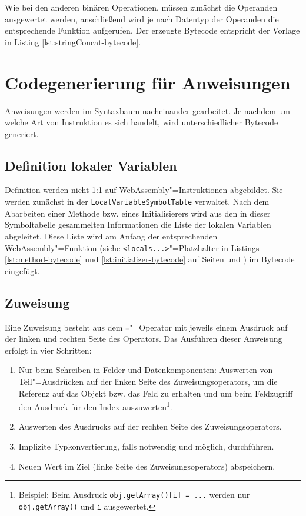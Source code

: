 Wie bei den anderen binären Operationen, müssen zunächst die Operanden ausgewertet werden, anschließend wird je nach Datentyp der Operanden die entsprechende Funktion aufgerufen. Der erzeugte Bytecode entspricht der Vorlage in Listing \ref{lst:stringConcat-bytecode}.



\section{Codegenerierung für Anweisungen}

Anweisungen werden im Syntaxbaum nacheinander gearbeitet. Je nachdem um welche Art von Instruktion es sich handelt, wird unterschiedlicher Bytecode generiert.

\subsection{Definition lokaler Variablen}

Definition werden nicht 1:1 auf WebAssembly"=Instruktionen abgebildet. Sie werden zunächst in der \lstinline{LocalVariableSymbolTable} verwaltet. Nach dem Abarbeiten einer Methode bzw. eines Initialisierers wird aus den in dieser Symboltabelle gesammelten Informationen die Liste der lokalen Variablen abgeleitet. Diese Liste wird am Anfang der entsprechenden WebAssembly"=Funktion (siehe \lstinline{<locals...>}"=Platzhalter in Listings \ref{lst:method-bytecode} und \ref{lst:initializer-bytecode} auf Seiten \pageref{lst:method-bytecode} und \pageref{lst:initializer-bytecode}) im Bytecode eingefügt.

\subsection{Zuweisung}
\label{subsec:Zuweisung}
Eine Zuweisung besteht aus dem \lstinline{=}"=Operator mit jeweils einem Ausdruck auf der linken und rechten Seite des Operators. Das Ausführen dieser Anweisung erfolgt in vier Schritten:
\begin{enumerate}
    \item Nur beim Schreiben in Felder und Datenkomponenten: Auswerten von Teil"=Ausdrücken auf der linken Seite des Zuweisungsoperators, um die Referenz auf das Objekt bzw. das Feld zu erhalten und um beim Feldzugriff den Ausdruck für den Index auszuwerten\footnote{Beispiel: Beim Ausdruck \lstinline{obj.getArray()[i] = ...} werden nur \lstinline{obj.getArray()} und \lstinline{i} ausgewertet.}.
    \item Auswerten des Ausdrucks auf der rechten Seite des Zuweisungsoperators.
    \item Implizite Typkonvertierung, falls notwendig und möglich, durchführen.
    \item Neuen Wert im Ziel (linke Seite des Zuweisungsoperators) abspeichern. 
\end{enumerate}

